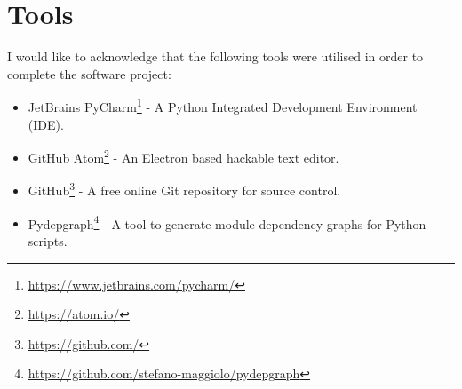 \section{Tools}

I would like to acknowledge that the following tools were utilised in order to complete the software project:

\begin{itemize}
    \item JetBrains PyCharm\footnote{\url{https://www.jetbrains.com/pycharm/}} - A Python Integrated Development Environment (IDE).
    \item GitHub Atom\footnote{\url{https://atom.io/}} - An Electron based hackable text editor.
    \item GitHub\footnote{\url{https://github.com/}} - A free online Git repository for source control.
    \item Pydepgraph\footnote{\url{https://github.com/stefano-maggiolo/pydepgraph}} - A tool to generate module dependency graphs for Python scripts.
\end{itemize}